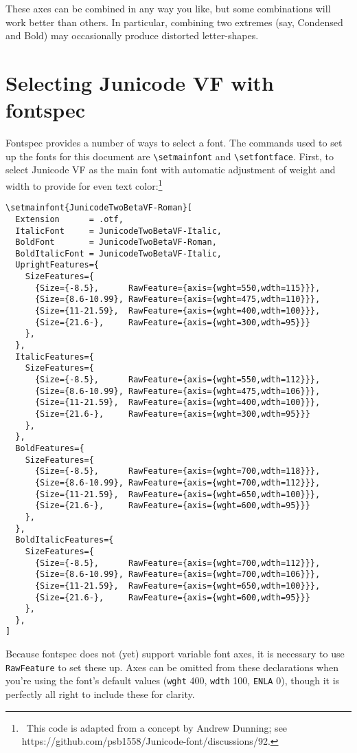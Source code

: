\documentclass[11pt]{article}
\begin{document}
These axes can be combined in any way you like, but some combinations
will work better than others. In particular, combining two extremes (say,
Condensed and Bold) may occasionally produce distorted letter-shapes.

\section*{Selecting Junicode VF with fontspec}

Fontspec provides a number of ways to select a font. The commands used
to set up the fonts for this document
are \verb|\setmainfont| and \verb|\setfontface|. First, to select Junicode
VF as the main font with automatic adjustment of weight and width to
provide for even text color:\footnote{\ This code is adapted from a concept
by Andrew Dunning; see https://github.com\slash psb1558\slash Junicode-font/discussions/92.}

\scriptsize\begin{verbatim}
\setmainfont{JunicodeTwoBetaVF-Roman}[
  Extension      = .otf,
  ItalicFont     = JunicodeTwoBetaVF-Italic,
  BoldFont       = JunicodeTwoBetaVF-Roman,
  BoldItalicFont = JunicodeTwoBetaVF-Italic,
  UprightFeatures={
    SizeFeatures={
      {Size={-8.5},      RawFeature={axis={wght=550,wdth=115}}},
      {Size={8.6-10.99}, RawFeature={axis={wght=475,wdth=110}}},
      {Size={11-21.59},  RawFeature={axis={wght=400,wdth=100}}},
      {Size={21.6-},     RawFeature={axis={wght=300,wdth=95}}}
    },
  },
  ItalicFeatures={
    SizeFeatures={
      {Size={-8.5},      RawFeature={axis={wght=550,wdth=112}}},
      {Size={8.6-10.99}, RawFeature={axis={wght=475,wdth=106}}},
      {Size={11-21.59},  RawFeature={axis={wght=400,wdth=100}}},
      {Size={21.6-},     RawFeature={axis={wght=300,wdth=95}}}
    },
  },
  BoldFeatures={
    SizeFeatures={
      {Size={-8.5},      RawFeature={axis={wght=700,wdth=118}}},
      {Size={8.6-10.99}, RawFeature={axis={wght=700,wdth=112}}},
      {Size={11-21.59},  RawFeature={axis={wght=650,wdth=100}}},
      {Size={21.6-},     RawFeature={axis={wght=600,wdth=95}}}
    },
  },
  BoldItalicFeatures={
    SizeFeatures={
      {Size={-8.5},      RawFeature={axis={wght=700,wdth=112}}},
      {Size={8.6-10.99}, RawFeature={axis={wght=700,wdth=106}}},
      {Size={11-21.59},  RawFeature={axis={wght=650,wdth=100}}},
      {Size={21.6-},     RawFeature={axis={wght=600,wdth=95}}}
    },
  },
]
\end{verbatim}

\normalsize Because fontspec does not (yet) support variable font axes, it is
necessary to use \texttt{RawFeature} to set these up. Axes can be omitted
from these declarations when you're using the font's default values
(\texttt{wght} 400, \texttt{wdth} 100, \texttt{ENLA} 0),
though it is perfectly all right to include these for clarity.\\
\end{document}
